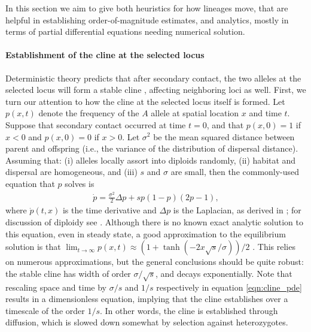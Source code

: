\documentclass[11pt,letterpaper]{article}
\newcommand{\alisa}[1]{{\em \color{red} #1}}
\newcommand{\plr}[1]{{\em \color{blue} #1}}
\begin{document}
In this section we aim to give both heuristics for how lineages move, 
that are helpful in establishing order-of-magnitude estimates,
and analytics, mostly in terms of partial differential equations needing numerical solution.

\paragraph{Establishment of the cline at the selected locus}
Deterministic theory predicts that after secondary contact,
the two alleles at the selected locus will form a stable cline \citep{Barton1979},
affecting neighboring loci as well.
First, we turn our attention to how the cline at the selected locus itself is formed.
Let $p(x,t)$ denote the frequency of the $A$ allele at spatial location $x$ and time $t$.  
Suppose that secondary contact occurred at time $t=0$, 
and that $p(x,0) = 1$ if $x<0$ and $p(x,0)=0$ if $x>0$.
Let $\sigma^2$ be the mean squared distance between parent and offspring 
(i.e., the variance of the distribution of dispersal distance).
Assuming that: (i) alleles locally assort into diploids randomly, 
(ii) habitat and dispersal are homogeneous, and 
(iii) $s$ and $\sigma$ are small, then the commonly-used equation that $p$ solves is
\begin{align} \label{eqn:cline_pde}
    \dot p = \frac{\sigma^2}{2} \Delta p + s p (1-p) (2p-1) ,
\end{align}
where $\dot p(t,x)$ is the time derivative and $\Delta p$ is the Laplacian,
as derived in \citet{Bazykin1969}; for discussion of diploidy see \citet{christiansen1995genotypic}.
Although there is no known exact analytic solution to this equation, even in steady state, 
a good approximation to the equilibrium solution is that
$\lim_{t \to \infty} p(x,t) \approx (1+\tanh(-2x\sqrt{s}/\sigma))/2$ \citep{Bazykin1969}. 
This relies on numerous approximations, but the general conclusions should be quite robust: 
the stable cline has width of order $\sigma/\sqrt{s}$, and decays exponentially. 
Note that rescaling space and time by $\sigma/s$ and $1/s$ respectively in equation \eqref{eqn:cline_pde} results in a dimensionless equation,
implying that the cline establishes over a timescale of the order $1/s$. 
In other words, the cline is established through diffusion, which is slowed down somewhat by selection against heterozygotes. 
\end{document}
